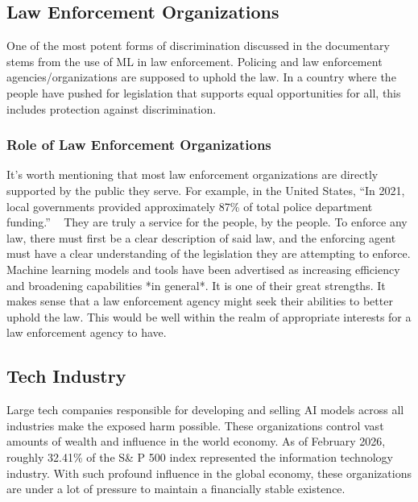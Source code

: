 \documentclass[sigconf, 10pt]{acmart}
\begin{document}
\subsection{Law Enforcement Organizations}
One of the most potent forms of discrimination discussed in the documentary stems from the use of ML in law enforcement. Policing and law enforcement agencies/organizations are supposed to uphold the law. In a country where the people have pushed for legislation that supports equal opportunities for all, this includes protection against discrimination.
\subsubsection{Role of Law Enforcement Organizations}
It’s worth mentioning that most law enforcement organizations are directly supported by the public they serve. For example, in the United States, “In 2021, local governments provided approximately 87\% of total police department funding.” ~\cite{used_eighth(7)} They are truly a service for the people, by the people. To enforce any law, there must first be a clear description of said law, and the enforcing agent must have a clear understanding of the legislation they are attempting to enforce. Machine learning models and tools have been advertised as increasing efficiency and broadening capabilities *in general*. It is one of their great strengths. It makes sense that a law enforcement agency might seek their abilities to better uphold the law. This would be well within the realm of appropriate interests for a law enforcement agency to have. 
\subsection{Tech Industry}
Large tech companies responsible for developing and selling AI models across all industries make the exposed harm possible. These organizations control vast amounts of wealth and influence in the world economy. As of February 2026, roughly 32.41\% of the S\& P 500 index represented the information technology industry. With such profound influence in the global economy, these organizations are under a lot of pressure to maintain a financially stable existence.
\end{document}
